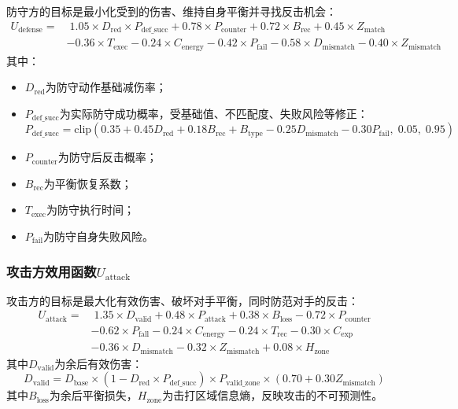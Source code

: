 \documentclass[a4paper,12pt]{article}
\numberwithin{equation}{section}
\numberwithin{table}{section}
\numberwithin{figure}{section}
\begin{document}
防守方的目标是最小化受到的伤害、维持自身平衡并寻找反击机会：
\begin{equation}
    \begin{aligned}
        U_{\text{defense}} = &\; 1.05 \times D_{\text{red}} \times P_{\text{def\_succ}} + 0.78 \times P_{\text{counter}} + 0.72 \times B_{\text{rec}} + 0.45 \times Z_{\text{match}} \\
        &- 0.36 \times T_{\text{exec}} - 0.24 \times C_{\text{energy}} - 0.42 \times P_{\text{fail}} - 0.58 \times D_{\text{mismatch}} - 0.40 \times Z_{\text{mismatch}}
    \end{aligned}
    \label{eq:udef}
\end{equation}
其中：
\begin{itemize}
    \item $D_{\text{red}}$为防守动作基础减伤率；
    \item $P_{\text{def\_succ}}$为实际防守成功概率，受基础值、不匹配度、失败风险等修正：
    \begin{equation}
        P_{\text{def\_succ}} = \text{clip}\left(0.35 + 0.45 D_{\text{red}} + 0.18 B_{\text{rec}} + B_{\text{type}} - 0.25 D_{\text{mismatch}} - 0.30 P_{\text{fail}},\; 0.05,\; 0.95\right)
        \label{eq:pdefsucc}
    \end{equation}
    \item $P_{\text{counter}}$为防守后反击概率；
    \item $B_{\text{rec}}$为平衡恢复系数；
    \item $T_{\text{exec}}$为防守执行时间；
    \item $P_{\text{fail}}$为防守自身失败风险。
\end{itemize}

\subsubsection{攻击方效用函数$U_{\text{attack}}$}

攻击方的目标是最大化有效伤害、破坏对手平衡，同时防范对手的反击：
\begin{equation}
    \begin{aligned}
        U_{\text{attack}} = &\; 1.35 \times D_{\text{valid}} + 0.48 \times P_{\text{attack}} + 0.38 \times B_{\text{loss}} - 0.72 \times P_{\text{counter}} \\
        &- 0.62 \times P_{\text{fall}} - 0.24 \times C_{\text{energy}} - 0.24 \times T_{\text{rec}} - 0.30 \times C_{\text{exp}} \\
        &- 0.36 \times D_{\text{mismatch}} - 0.32 \times Z_{\text{mismatch}} + 0.08 \times H_{\text{zone}}
    \end{aligned}
    \label{eq:uatk}
\end{equation}
其中$D_{\text{valid}}$为余后有效伤害：
\begin{equation}
    D_{\text{valid}} = D_{\text{base}} \times (1 - D_{\text{red}} \times P_{\text{def\_succ}}) \times P_{\text{valid\_zone}} \times (0.70 + 0.30 Z_{\text{mismatch}})
    \label{eq:dvalid}
\end{equation}
其中$B_{\text{loss}}$为余后平衡损失，$H_{\text{zone}}$为击打区域信息熵，反映攻击的不可预测性。
\end{document}
